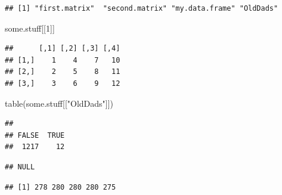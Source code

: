 \documentclass[
]{book}
\newenvironment{Shaded}{\begin{snugshade}}{\end{snugshade}}
\newcommand{\DecValTok}[1]{\textcolor[rgb]{0.00,0.00,0.81}{#1}}
\newcommand{\FunctionTok}[1]{\textcolor[rgb]{0.00,0.00,0.00}{#1}}
\newcommand{\NormalTok}[1]{#1}
\newcommand{\SpecialCharTok}[1]{\textcolor[rgb]{0.00,0.00,0.00}{#1}}
\newcommand{\StringTok}[1]{\textcolor[rgb]{0.31,0.60,0.02}{#1}}
\begin{document}
\begin{verbatim}
## [1] "first.matrix"  "second.matrix" "my.data.frame" "OldDads"
\end{verbatim}

\begin{Shaded}
\begin{Highlighting}[]
\NormalTok{some.stuff[[}\DecValTok{1}\NormalTok{]] }
\end{Highlighting}
\end{Shaded}

\begin{verbatim}
##      [,1] [,2] [,3] [,4]
## [1,]    1    4    7   10
## [2,]    2    5    8   11
## [3,]    3    6    9   12
\end{verbatim}

\begin{Shaded}
\begin{Highlighting}[]
\FunctionTok{table}\NormalTok{(some.stuff[[}\StringTok{"OldDads"}\NormalTok{]])  }
\end{Highlighting}
\end{Shaded}

\begin{verbatim}
## 
## FALSE  TRUE 
##  1217    12
\end{verbatim}

\begin{Shaded}
\end{Shaded}

\begin{verbatim}
## NULL
\end{verbatim}

\begin{Shaded}
\end{Shaded}

\begin{verbatim}
## [1] 278 280 280 280 275
\end{verbatim}

  
\end{document}
